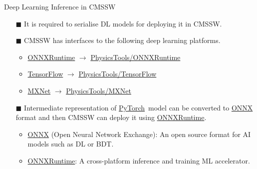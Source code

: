 \documentclass[10pt]{beamer}
\newcommand{\pytorch}{{\color{pytorchorange} PyTorch}}
\begin{document}



\begin{frame}[fragile]{Deep Learning Inference in CMSSW}

\begin{itemize}
    \item[$\blacksquare$] It is required to serialise DL models for deploying it in CMSSW.
    \item[$\blacksquare$] CMSSW has interfaces to the following deep learning platforms.
    \begin{itemize}
        \item \href{https://github.com/microsoft/onnxruntime}{ONNXRuntime} $\rightarrow$ \href{https://github.com/cms-sw/cmssw/tree/master/PhysicsTools/ONNXRuntime}{PhysicsTools/ONNXRuntime}
        \item \href{https://github.com/tensorflow/tensorflow}{TensorFlow} $\rightarrow$ \href{https://github.com/cms-sw/cmssw/tree/master/PhysicsTools/TensorFlow}{PhysicsTools/TensorFlow}
        \item \href{https://github.com/apache/incubator-mxnet}{MXNet} $\rightarrow$ \href{https://github.com/cms-sw/cmssw/tree/master/PhysicsTools/MXNet}{PhysicsTools/MXNet}
    \end{itemize}
    \item[$\blacksquare$] Intermediate representation of \href{https://github.com/pytorch/pytorch}{\pytorch}\ model can be converted to \href{https://github.com/onnx/onnx}{ONNX} format and then CMSSW can deploy it using \href{https://github.com/microsoft/onnxruntime}{ONNXRuntime}.
    \begin{itemize}
        \item \href{https://github.com/onnx/onnx}{ONNX} (Open Neural Network Exchange): An open source format for AI models such as DL or BDT.
        \item \href{https://github.com/microsoft/onnxruntime}{ONNXRuntime}: A cross-platform inference and training ML accelerator.
    \end{itemize}
\end{itemize}
\end{frame}
\end{document}
